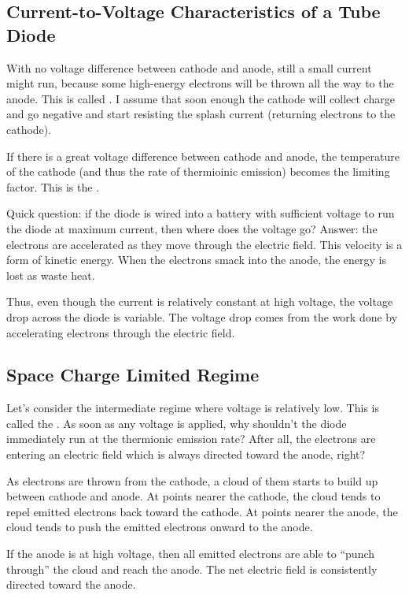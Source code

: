 \documentclass[11pt, oneside]{amsart}
\begin{document}
\subsection{Current-to-Voltage Characteristics of a Tube Diode}

With no voltage difference between cathode and anode, still a small
current might run, because some high-energy electrons will be thrown all
the way to the anode. This is called . I assume
that soon enough the cathode will collect charge and go negative and
start resisting the splash current (returning electrons to the cathode).

If there is a great voltage difference between cathode and anode, the
temperature of the cathode (and thus the rate of thermioinic emission)
becomes the limiting factor. This is the .

Quick question: if the diode is wired into a battery with sufficient
voltage to run the diode at maximum current, then where does the voltage
go? Answer: the electrons are accelerated as they move through the
electric field. This velocity is a form of kinetic energy. When the
electrons smack into the anode, the energy is lost as waste heat.

Thus, even though the current is relatively constant at high voltage,
the voltage drop across the diode is variable. The voltage drop comes
from the work done by accelerating electrons through the electric field.

\subsection{Space Charge Limited Regime}

Let's consider the intermediate regime where voltage is relatively low.
This is called the . As soon as any
voltage is applied, why shouldn't the diode immediately run at the
thermionic emission rate? After all, the electrons are entering an
electric field which is always directed toward the anode, right?

As electrons are thrown from the cathode, a cloud of them starts to
build up between cathode and anode. At points nearer the cathode, the
cloud tends to repel emitted electrons back toward the cathode. At
points nearer the anode, the cloud tends to push the emitted electrons
onward to the anode.

If the anode is at high voltage, then all emitted electrons are able to
``punch through'' the cloud and reach the anode. The net electric field
is consistently directed toward the anode.
\end{document}
